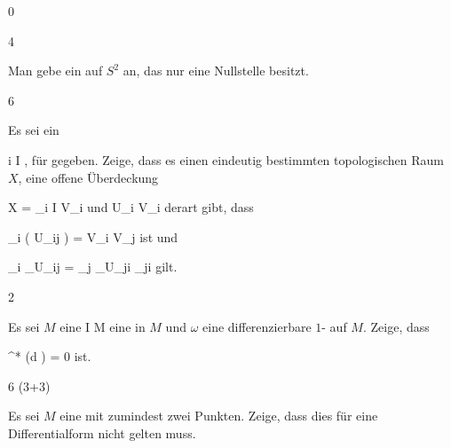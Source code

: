 {0}
{

}
{} {}

{4}
{

Man gebe ein
 
auf $S^2$ an, das nur eine Nullstelle besitzt.

}
{} {}

{6}
{

Es sei ein

 {}
 {i \in I} {}
 {} {} {} {,}
für
gegeben. Zeige, dass es einen eindeutig bestimmten topologischen Raum $X$, eine offene Überdeckung

\mavergleichskette
{\vergleichskette
{ X
}
{ = }{ \bigcup_{i \in I} V_i
}
{  }{
}
{    }{
}
{   }{
}
}
{}{}{}
und
 {U_i } { V_i
} {}
derart gibt, dass

\mavergleichskettedisp
{\vergleichskette
{ \psi_i  \left(  U_{ij}  \right)
}
{ =} { V_i \cap V_j
}
{ } {
}
{ } {
}
{ } {
}
}
{}{}{}
ist und

\mavergleichskettedisp
{\vergleichskette
{ \psi_i \vert_{U_{ij} }
}
{ =} { \psi_j \vert_{U_{ji} }  \circ   \varphi_{ji}
}
{ } {
}
{ } {
}
{ } {
}
}
{}{}{}
gilt.

}
{} {}

{2}
{

Es sei $M$ eine
\maabb {\gamma} { I } { M
} {}
eine
in $M$ und $\omega$ eine differenzierbare
$1$-
auf $M$. Zeige, dass

\mavergleichskettedisp
{\vergleichskette
{ \gamma^* (d \omega)
}
{ =} { 0
}
{ } {
}
{ } {
}
{ } {
}
}
{}{}{}
ist.

}
{} {}

{6 (3+3)}
{

Es sei $M$ eine
mit zumindest zwei Punkten.
 {Zeige, dass dies für eine
Differentialform nicht gelten muss.
}

}
{} {}

